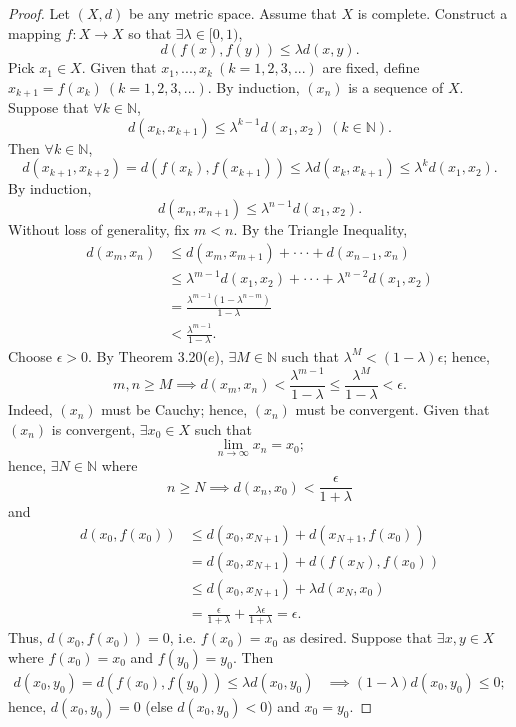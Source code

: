 \documentclass{amsart}
\theoremstyle{definition}
\begin{document}
\begin{proof}
    Let $(X,d)$ be any metric space. Assume that $X$ is complete. Construct a mapping $f: X \to X$ so that $\exists \lambda \in [0,1)$, 
    \[
    d(f(x),f(y)) \leq \lambda d(x,y).
    \]
    Pick $x_1 \in X$. Given that $x_1,...,x_k \ (k = 1,2,3,...)$ are fixed, define $x_{k+1} = f(x_k) \ (k = 1,2,3,...)$. By induction, $(x_n)$ is a sequence of $X$. Suppose that $\forall k \in \mathbb{N}$,
    \[
    d(x_k,x_{k+1}) \leq \lambda^{k-1} d(x_1,x_2) \ (k \in \mathbb{N}). 
    \]
    Then $\forall k \in \mathbb{N}$,
    \[
    d(x_{k+1},x_{k+2}) = d(f(x_{k}),f(x_{k+1})) \leq \lambda d(x_k,x_{k+1}) \leq \lambda^k d(x_1,x_2).
    \]
    By induction, 
    \[
    d(x_n,x_{n+1}) \leq \lambda^{n-1} d(x_1,x_2).
    \]
    Without loss of generality, fix $m < n$. By the Triangle Inequality,
    \begin{align*}
        d(x_m,x_n) &\leq d(x_m,x_{m+1}) + \cdot \cdot \cdot + d(x_{n-1},x_n) \\
        &\leq \lambda^{m-1}d(x_1,x_2) + \cdot \cdot \cdot + \lambda^{n-2}d(x_1,x_2) \\
        &= \frac{\lambda^{m-1}(1-\lambda^{n-m})}{1 - \lambda} \\
        &< \frac{\lambda^{m-1}}{1-\lambda}.
    \end{align*}
    Choose $\epsilon > 0$. By Theorem 3.20($e$), $\exists M \in \mathbb{N}$ such that $\lambda^M < (1-\lambda)\epsilon$; hence,
    \[
    m,n \geq M \implies d(x_m,x_n) < \frac{\lambda^{m-1}}{1-\lambda} \leq \frac{\lambda^M}{1-\lambda} < \epsilon.
    \]
    Indeed, $(x_n)$ must be Cauchy; hence, $(x_n)$ must be convergent. Given that $(x_n)$ is convergent, $\exists x_0 \in X$ such that
    \[
    \lim_{n \to \infty}x_n = x_0;
    \]
    hence, $\exists N \in \mathbb{N}$ where 
    \[
    n \geq N \implies d(x_n,x_0) < \frac{\epsilon}{1+\lambda}
    \]
    and 
    \begin{align*}
        d(x_0,f(x_0)) &\leq d(x_0,x_{N+1}) + d(x_{N+1},f(x_0)) \\
        &= d(x_0,x_{N+1}) + d(f(x_N),f(x_0)) \\
        &\leq d(x_0,x_{N+1}) + \lambda d(x_N,x_0) \\
        &= \frac{\epsilon}{1+\lambda} + \frac{\lambda \epsilon}{1+\lambda} = \epsilon.
    \end{align*}
    Thus, $d(x_0,f(x_0)) = 0$, i.e. $f(x_0) = x_0$ as desired. Suppose that $\exists x,y \in X$ where $f(x_0) = x_0$ and $f(y_0) = y_0$.
    Then 
    \begin{align*}
        d(x_0,y_0) = d(f(x_0),f(y_0)) \leq \lambda d(x_0,y_0)
        &\implies (1-\lambda)d(x_0,y_0) \leq 0;
    \end{align*}
    hence, $d(x_0,y_0) = 0$ (else $d(x_0,y_0) < 0$) and $x_0 = y_0$.
\end{proof}
\end{document}

